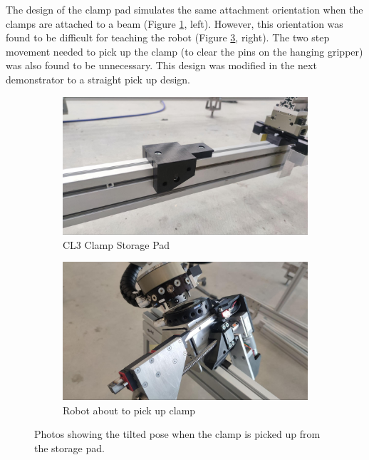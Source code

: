 The design of the clamp pad simulates the same attachment orientation when the clamps are attached to a beam (Figure \ref{fig:cl3-clamp-storage-pad}, left). However, this orientation was found to be difficult for teaching the robot (Figure \ref{fig:about-to-pick-up-clamp}, right). The two step movement needed to pick up the clamp (to clear the pins on the hanging gripper) was also found to be unnecessary. This design was modified in the next demonstrator to a straight pick up design.

\begin{figure}[!h]
    \centering
    \begin{subfigure}[b]{0.49\textwidth}
        \centering
        \includegraphics[width=\textwidth]{images/6a/img03.jpg}
        \caption{CL3 Clamp Storage Pad}
        \label{fig:cl3-clamp-storage-pad}
    \end{subfigure}
    \hfill
    \begin{subfigure}[b]{0.49\textwidth}
        \centering
        \includegraphics[width=\textwidth]{images/6a/img04.jpg}
        \caption{Robot about to pick up clamp}
        \label{fig:about-to-pick-up-clamp}
    \end{subfigure}
    \caption{Photos showing the tilted pose when the clamp is picked up from the storage pad.}
\end{figure}

